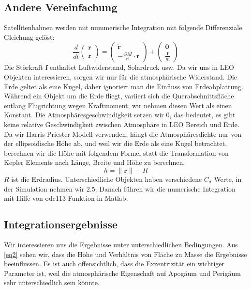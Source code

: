 \documentclass{article}
\begin{document}
\subsection{Andere Vereinfachung}
Satellitenbahnen werden mit nummerische Integration mit folgende Differenziale Gleichung gelöst:
\begin{equation}
	\frac{d}{dt} \begin{pmatrix}
		\bm{r} \\
		\bm{\dot{r}}
	\end{pmatrix} = \begin{pmatrix}
	\bm{\dot{r}} \\
	- \frac{GM}{r^3} \cdot \bm{r}
\end{pmatrix} + \begin{pmatrix}
\bm{0} \\
\frac{\bm{f}}{m}
\end{pmatrix}
\end{equation}
Die Störkraft $\bm{f}$ enthaltet Luftwiderstand, Solardruck usw. Da wir uns in LEO Objekten interessieren, sorgen wir nur für die atmosphärische Widerstand. Die Erde geltet als eine Kugel, daher ignoriert man die Einfluss von Erdeabplattung. Während ein Objekt um die Erde fliegt, variiert sich die Querabschnittsfläche entlang Flugrichtung wegen Kraftmoment, wir nehmen diesen Wert als einen Konstant. Die Atmosphäresgeschwindigkeit setzen wir $0$, das bedeutet, es gibt keine relative Geschwindigkeit zwischen Atmosphäre in LEO Bereich und Erde. Da wir Harris-Priester Modell verwenden, hängt die Atmosphäresdichte nur von der ellipsoidische Höhe ab, und weil wir die Erde als eine Kugel betrachtet, berechnen wir die Höhe mit folgendem Formel statt die Transformation von Kepler Elements nach Länge, Breite und Höhe zu berechnen.
\begin{equation}
	h = \lVert \bm{r} \rVert - R
\end{equation}
$R$ ist die Erdradius. Unterschiedliche Objekten haben verschiedene $C_d$ Werte, in der Simulation nehmen wir $2.5$. Danach führen wir die numerische Integration mit Hilfe von ode113 Funktion in Matlab.
\clearpage
\subsection{Integrationsergebnisse}
Wir interessieren uns die Ergebnisse unter unterschiedlichen Bedingungen. Aus \autoref{eq2} sehen wir, dass die Höhe und Verhältnis von Fläche zu Masse die Ergebnisse beeinflussen. Es ist auch offensichtlich, dass die Exzentrizität ein wichtiger Parameter ist, weil die atmosphärische Eigenschaft auf Apogäum und Perigäum sehr unterschiedlich sein könnte.
\end{document}
